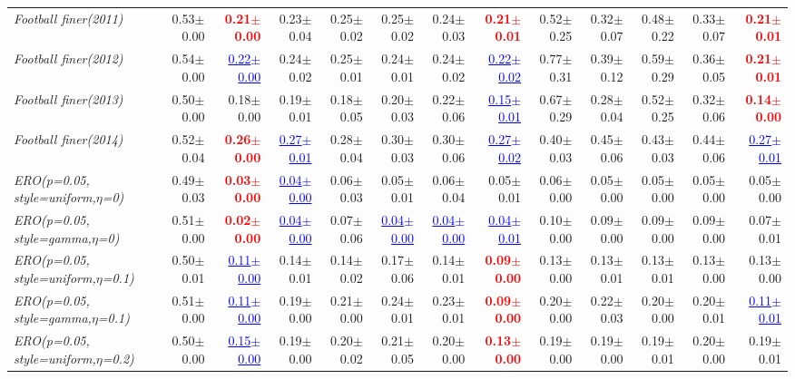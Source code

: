 \documentclass[nohyperref]{article}
\theoremstyle{plain}
\theoremstyle{definition}
\theoremstyle{remark}
\newcommand{\red}[1]{\textcolor{red}{\textbf{#1}}}
\newcommand{\blue}[1]{\textcolor{blue}{\underline{#1}}}
\begin{document}
\begin{table*}[!ht]
{\begin{tabular}{lrr|rrrrr|rrrrr}
			{\it Football finer(2011)} & 0.53$\pm$0.00 & \red{0.21$\pm$0.00} & 0.23$\pm$0.04 & 0.25$\pm$0.02 & 0.25$\pm$0.02 & 0.24$\pm$0.03 & \red{0.21$\pm$0.01} & 0.52$\pm$0.25 & 0.32$\pm$0.07 & 0.48$\pm$0.22 & 0.33$\pm$0.07 & \red{0.21$\pm$0.01} \\
			{\it Football finer(2012)} & 0.54$\pm$0.00 & \blue{0.22$\pm$0.00} & 0.24$\pm$0.02 & 0.25$\pm$0.01 & 0.24$\pm$0.01 & 0.24$\pm$0.02 & \blue{0.22$\pm$0.02} & 0.77$\pm$0.31 & 0.39$\pm$0.12 & 0.59$\pm$0.29 & 0.36$\pm$0.05 & \red{0.21$\pm$0.01} \\
			{\it Football finer(2013)} & 0.50$\pm$0.00 & 0.18$\pm$0.00 & 0.19$\pm$0.01 & 0.18$\pm$0.05 & 0.20$\pm$0.03 & 0.22$\pm$0.06 & \blue{0.15$\pm$0.01} & 0.67$\pm$0.29 & 0.28$\pm$0.04 & 0.52$\pm$0.25 & 0.32$\pm$0.06 & \red{0.14$\pm$0.00} \\
			{\it Football finer(2014)} & 0.52$\pm$0.04 & \red{0.26$\pm$0.00} & \blue{0.27$\pm$0.01} & 0.28$\pm$0.04 & 0.30$\pm$0.03 & 0.30$\pm$0.06 & \blue{0.27$\pm$0.02} & 0.40$\pm$0.03 & 0.45$\pm$0.06 & 0.43$\pm$0.03 & 0.44$\pm$0.06 & \blue{0.27$\pm$0.01} \\
{\it ERO(p=0.05, style=uniform,$\eta$=0)} & 0.49$\pm$0.03 & \red{0.03$\pm$0.00} & \blue{0.04$\pm$0.00} & 0.06$\pm$0.03 & 0.05$\pm$0.01 & 0.06$\pm$0.04 & 0.05$\pm$0.01 & 0.06$\pm$0.00 & 0.05$\pm$0.00 & 0.05$\pm$0.00 & 0.05$\pm$0.00 & 0.05$\pm$0.00 \\
			{\it ERO(p=0.05, style=gamma,$\eta$=0)} & 0.51$\pm$0.00 & \red{0.02$\pm$0.00} & \blue{0.04$\pm$0.00} & 0.07$\pm$0.06 & \blue{0.04$\pm$0.00} & \blue{0.04$\pm$0.00} & \blue{0.04$\pm$0.01} & 0.10$\pm$0.00 & 0.09$\pm$0.00 & 0.09$\pm$0.00 & 0.09$\pm$0.00 & 0.07$\pm$0.01 \\
			{\it ERO(p=0.05, style=uniform,$\eta$=0.1)} & 0.50$\pm$0.01 & \blue{0.11$\pm$0.00} & 0.14$\pm$0.01 & 0.14$\pm$0.02 & 0.17$\pm$0.06 & 0.14$\pm$0.01 & \red{0.09$\pm$0.00} & 0.13$\pm$0.00 & 0.13$\pm$0.01 & 0.13$\pm$0.01 & 0.13$\pm$0.00 & 0.13$\pm$0.00 \\
			{\it ERO(p=0.05, style=gamma,$\eta$=0.1)} & 0.51$\pm$0.00 & \blue{0.11$\pm$0.00} & 0.19$\pm$0.00 & 0.21$\pm$0.00 & 0.24$\pm$0.01 & 0.23$\pm$0.01 & \red{0.09$\pm$0.00} & 0.20$\pm$0.00 & 0.22$\pm$0.03 & 0.20$\pm$0.00 & 0.20$\pm$0.01 & \blue{0.11$\pm$0.01} \\
			{\it ERO(p=0.05, style=uniform,$\eta$=0.2)} & 0.50$\pm$0.00 & \blue{0.15$\pm$0.00} & 0.19$\pm$0.00 & 0.20$\pm$0.02 & 0.21$\pm$0.05 & 0.20$\pm$0.00 & \red{0.13$\pm$0.00} & 0.19$\pm$0.00 & 0.19$\pm$0.00 & 0.19$\pm$0.01 & 0.20$\pm$0.00 & 0.19$\pm$0.01 \\

\end{tabular}}
\end{table*}
\end{document}
